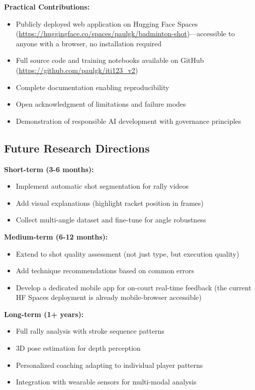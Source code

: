 \documentclass[11pt,a4paper]{article}
\begin{document}
\textbf{Practical Contributions:}
\begin{itemize}
\item Publicly deployed web application on Hugging Face Spaces (\url{https://huggingface.co/spaces/paulgk/badminton-shot})---accessible to anyone with a browser, no installation required
\item Full source code and training notebooks available on GitHub (\url{https://github.com/paulgk/iti123_v2})
\item Complete documentation enabling reproducibility
\item Open acknowledgment of limitations and failure modes
\item Demonstration of responsible AI development with governance principles
\end{itemize}

\subsection{Future Research Directions}

\textbf{Short-term (3-6 months):}
\begin{itemize}
\item Implement automatic shot segmentation for rally videos
\item Add visual explanations (highlight racket position in frames)
\item Collect multi-angle dataset and fine-tune for angle robustness
\end{itemize}

\textbf{Medium-term (6-12 months):}
\begin{itemize}
\item Extend to shot quality assessment (not just type, but execution quality)
\item Add technique recommendations based on common errors
\item Develop a dedicated mobile app for on-court real-time feedback (the current HF Spaces deployment is already mobile-browser accessible)
\end{itemize}

\textbf{Long-term (1+ years):}
\begin{itemize}
\item Full rally analysis with stroke sequence patterns
\item 3D pose estimation for depth perception
\item Personalized coaching adapting to individual player patterns
\item Integration with wearable sensors for multi-modal analysis
\end{itemize}
\end{document}
